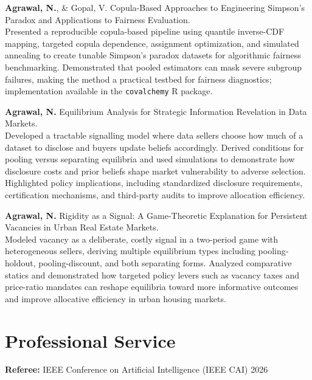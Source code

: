 \documentclass[10pt,a4paper]{article}
\begin{document}
\vspace{5pt}

\textbf{Agrawal, N.}, \& Gopal, V. Copula-Based Approaches to Engineering Simpson's Paradox and Applications to Fairness Evaluation.\\
{\small Presented a reproducible copula-based pipeline using quantile inverse-CDF mapping, targeted copula dependence, assignment optimization, and simulated annealing to create tunable Simpson's paradox datasets for algorithmic fairness benchmarking. Demonstrated that pooled estimators can mask severe subgroup failures, making the method a practical testbed for fairness diagnostics; implementation available in the \texttt{covalchemy} R package.}

\vspace{5pt}

\textbf{Agrawal, N.} Equilibrium Analysis for Strategic Information Revelation in Data Markets.\\
{\small Developed a tractable signalling model where data sellers choose how much of a dataset to disclose and buyers update beliefs accordingly. Derived conditions for pooling versus separating equilibria and used simulations to demonstrate how disclosure costs and prior beliefs shape market vulnerability to adverse selection. Highlighted policy implications, including standardized disclosure requirements, certification mechanisms, and third-party audits to improve allocation efficiency.}

\vspace{5pt}

\textbf{Agrawal, N.} Rigidity as a Signal: A Game-Theoretic Explanation for Persistent Vacancies in Urban Real Estate Markets.\\
{\small Modeled vacancy as a deliberate, costly signal in a two-period game with heterogeneous sellers, deriving multiple equilibrium types including pooling-holdout, pooling-discount, and both separating forms. Analyzed comparative statics and demonstrated how targeted policy levers such as vacancy taxes and price-ratio mandates can reshape equilibria toward more informative outcomes and improve allocative efficiency in urban housing markets.}

\section{Professional Service}

\textbf{Referee:} IEEE Conference on Artificial Intelligence (IEEE CAI) 2026
\end{document}
